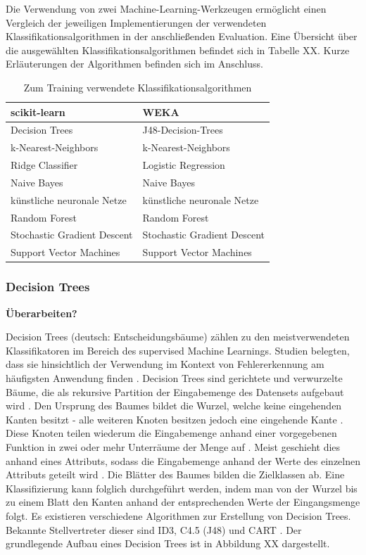 Die Verwendung von zwei Machine-Learning-Werkzeugen ermöglicht einen Vergleich der jeweiligen Implementierungen der verwendeten Klassifikationsalgorithmen in der anschließenden Evaluation. Eine Übersicht über die ausgewählten Klassifikationsalgorithmen befindet sich in Tabelle XX. Kurze Erläuterungen der Algorithmen befinden sich im Anschluss.


\begin{table}[]
\centering
\caption{Zum Training verwendete Klassifikationsalgorithmen}
\label{tab:classifiers}
\begin{tabular}{|l|l|}
\hline
\textbf{scikit-learn}       & \textbf{WEKA}               \\ \hline
Decision Trees              & J48-Decision-Trees          \\ \hline
k-Nearest-Neighbors         & k-Nearest-Neighbors         \\ \hline
Ridge Classifier            & Logistic Regression         \\ \hline
Naive Bayes                 & Naive Bayes                 \\ \hline
künstliche neuronale Netze  & künstliche neuronale Netze  \\ \hline
Random Forest               & Random Forest               \\ \hline
Stochastic Gradient Descent & Stochastic Gradient Descent \\ \hline
Support Vector Machines     & Support Vector Machines     \\ \hline
\end{tabular}
\end{table}

\subsubsection*{Decision Trees}

\textbf{Überarbeiten?}

Decision Trees (deutsch: Entscheidungsbäume) zählen zu den meistverwendeten Klassifikatoren im Bereich des supervised Machine Learnings. Studien belegten, dass sie hinsichtlich der Verwendung im Kontext von Fehlererkennung am häufigsten Anwendung finden \cite{Son2019}. Decision Trees sind gerichtete und verwurzelte Bäume, die als rekursive Partition der Eingabemenge des Datensets aufgebaut wird \cite{Rokach2005}. Den Ursprung des Baumes bildet die Wurzel, welche keine eingehenden Kanten besitzt - alle weiteren Knoten besitzen jedoch eine eingehende Kante \cite{Rokach2005}. Diese Knoten teilen wiederum die Eingabemenge anhand einer vorgegebenen Funktion in zwei oder mehr Unterräume der Menge auf \cite{Rokach2005}. Meist geschieht dies anhand eines Attributs, sodass die Eingabemenge anhand der Werte des einzelnen Attributs geteilt wird \cite{Rokach2005}. Die Blätter des Baumes bilden die Zielklassen ab. Eine Klassifizierung kann folglich durchgeführt werden, indem man von der Wurzel bis zu einem Blatt den Kanten anhand der entsprechenden Werte der Eingangsmenge folgt. Es existieren verschiedene Algorithmen zur Erstellung von Decision Trees. Bekannte Stellvertreter dieser sind ID3, C4.5 (J48) und CART \cite{Rokach2005}. Der grundlegende Aufbau eines Decision Trees ist in Abbildung XX dargestellt.

